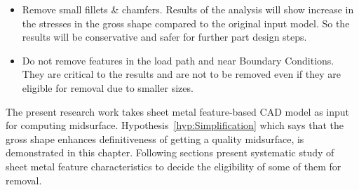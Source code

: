 \begin{itemize}[noitemsep,topsep=2pt,parsep=2pt,partopsep=2pt]
\item Remove small fillets \& chamfers. Results of the analysis will show increase in the stresses in the gross shape compared to the original input model. So the results will be conservative and safer for further part design steps.
\item Do not remove features in the load path and near Boundary Conditions. They are critical to the results and are not to be removed even if they are eligible for removal due to smaller sizes.
\end{itemize}

The present research work takes sheet metal feature-based CAD model as input for computing midsurface. Hypothesis~\ref{hyp:Simplification} which says that the gross shape enhances definitiveness of getting a quality midsurface, is demonstrated in this chapter. Following sections present systematic study of sheet metal feature characteristics to decide the eligibility of some of them for removal.
	
